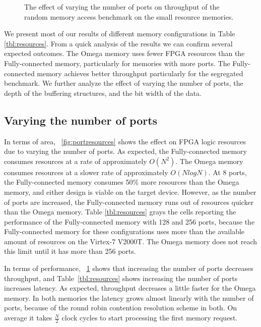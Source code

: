 \begin{figure}
    \caption{The effect of varying the number of ports on throughput of the random memory access benchmark on the small resource memories.}
    \label{fig:portthroughput}
\end{figure}


We present most of our results of different memory configurations in Table \ref{tbl:resources}. From a quick analysis of the results we can confirm several expected outcomes. The Omega memory uses fewer FPGA resources than the Fully-connected memory, particularly for memories with more ports. The Fully-connected memory achieves better throughput particularly for the segregated benchmark. We further analyze the effect of varying the number of ports, the depth of the buffering structures, and the bit width of the data.
\subsection{Varying the number of ports}
In terms of area, \figurename~\ref{fig:portresources} shows the effect on FPGA logic resources due to varying the number of ports. As expected, the Fully-connected memory consumes resources at a rate of approximately $O(N^2)$. The Omega memory consumes resources at a slower rate of approximately $O(NlogN)$. At 8 ports, the Fully-connected memory consumes 50\% more resources than the Omega memory, and either design is viable on the target device. However, as the number of ports are increased, the Fully-connected memory runs out of resources quicker than the Omega memory. Table \ref{tbl:resources} grays the cells reporting the performance of the Fully-connected memory with 128 and 256 ports, because the Fully-connected memory for these configurations uses more than the available amount of resources on the Virtex-7 V2000T. The Omega memory does not reach this limit until it has more than 256 ports.

In terms of performance, \figurename~\ref{fig:portthroughput} shows that increasing the number of ports decreases throughput, and Table~\ref{tbl:resources} shows increasing the number of ports increases latency. As expected, throughput decreases a little faster for the Omega memory. In both memories the latency grows almost linearly with the number of ports, because of the round robin contention resolution scheme in both. On average it takes $\frac{N}{2}$ clock cycles to start processing the first memory request.

